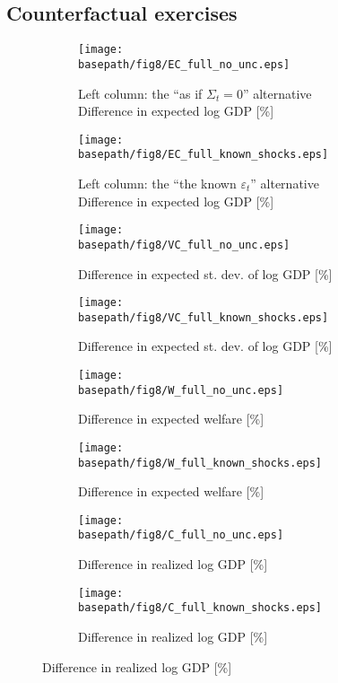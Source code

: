\documentclass[11pt]{article}
\theoremstyle{definition}
\newcommand{\basepath}{F:/12004835/replication_package_final/replication_package_final/output_figures}
\begin{document}
	\subsection{Counterfactual exercises}
	\begin{figure}[ht]
		\caption{The role of uncertainty in the postwar period}
		\centering
		\begin{subfigure}[b]{0.48\textwidth} 
			\caption{Left column: the ``as if $\Sigma_t=0$'' alternative \\
			Difference in expected log GDP [\%]}
			\texttt{[image: \\basepath/fig8/EC\_full\_no\_unc.eps]}
			\label{fig:8-a}
		\end{subfigure}
		\hfill
		\begin{subfigure}[b]{0.48\textwidth}
			\caption{Left column: the ``the known $\varepsilon_t$'' alternative \\
				Difference in expected log GDP [\%]}
			\texttt{[image: \\basepath/fig8/EC\_full\_known\_shocks.eps]}
			\label{fig:8-b}
		\end{subfigure}
		
		\begin{subfigure}[b]{0.48\textwidth} 
			\caption{Difference in expected st. dev. of log GDP [\%]}
			\texttt{[image: \\basepath/fig8/VC\_full\_no\_unc.eps]}
			\label{fig:8-c}
		\end{subfigure}
		\hfill
		\begin{subfigure}[b]{0.48\textwidth}
			\caption{Difference in expected st. dev. of log GDP [\%]}
			\texttt{[image: \\basepath/fig8/VC\_full\_known\_shocks.eps]}
			\label{fig:8-d}
		\end{subfigure}
		
		\begin{subfigure}[b]{0.48\textwidth} 
			\caption{Difference in expected welfare [\%]}
			\texttt{[image: \\basepath/fig8/W\_full\_no\_unc.eps]}
			\label{fig:8-e}
		\end{subfigure}
		\hfill
		\begin{subfigure}[b]{0.48\textwidth}
			\caption{Difference in expected welfare [\%]}
			\texttt{[image: \\basepath/fig8/W\_full\_known\_shocks.eps]}
			\label{fig:8-f}
		\end{subfigure}
		
		\begin{subfigure}[b]{0.48\textwidth} 
			\caption{Difference in realized log GDP [\%]}
			\texttt{[image: \\basepath/fig8/C\_full\_no\_unc.eps]}
			\label{fig:8-g}
		\end{subfigure}
		\hfill
		\begin{subfigure}[b]{0.48\textwidth}
			\caption{Difference in realized log GDP [\%]}
			\texttt{[image: \\basepath/fig8/C\_full\_known\_shocks.eps]}
			\label{fig:8-h}
		\end{subfigure}
		
		\label{fig:8}
	\end{figure}
	
	\clearpage
	
	
	
	
\end{document}

